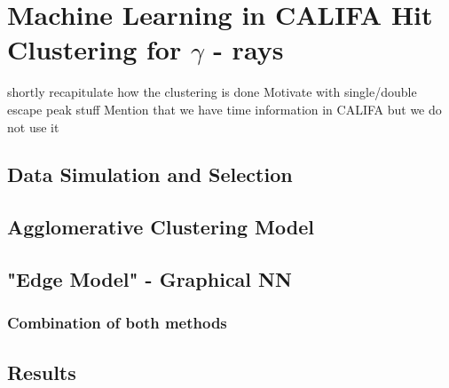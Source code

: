 \section{Machine Learning in CALIFA Hit Clustering for $\gamma$ - rays}
shortly recapitulate how the clustering is done
Motivate with single/double escape peak stuff
Mention that we have time information in CALIFA but we do not use it
\subsection{Data Simulation and Selection}

\subsection{Agglomerative Clustering Model}

\subsection{"Edge Model" - Graphical NN}

\subsubsection{Combination of both methods}


\subsection{Results}


